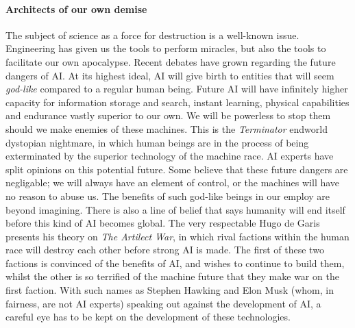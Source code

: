 \paragraph{Architects of our own demise}
The subject of science as a force for destruction is a well-known issue.
Engineering has given us the tools to perform miracles, but also the tools to facilitate our own apocalypse.
Recent debates have grown regarding the future dangers of AI.
At its highest ideal, AI will give birth to entities that will seem \emph{god-like} compared to a regular human being.
Future AI will have infinitely higher capacity for information storage and search, instant learning, physical capabilities and endurance vastly superior to our own. We will be powerless to stop them should we make enemies of these machines.
This is the \emph{Terminator} endworld dystopian nightmare, in which human beings are in the process of being exterminated by the superior technology of the machine race. 
AI experts have split opinions on this potential future.
Some believe that these future dangers are negligable; we will always have an element of control, or the machines will have no reason to abuse us.
The benefits of such god-like beings in our employ are beyond imagining.
There is also a line of belief that says humanity will end itself before this kind of AI becomes global.
The very respectable Hugo de Garis presents his theory on \emph{The Artilect War}\cite{artilect}, in which rival factions within the human race will destroy each other before strong AI is made.
The first of these two factions is convinced of the benefits of AI, and wishes to continue to build them, whilst the other is so terrified of the machine future that they make war on the first faction.
With such names as Stephen Hawking and Elon Musk (whom, in fairness, are not AI experts) speaking out against the development of AI, a careful eye has to be kept on the development of these technologies.